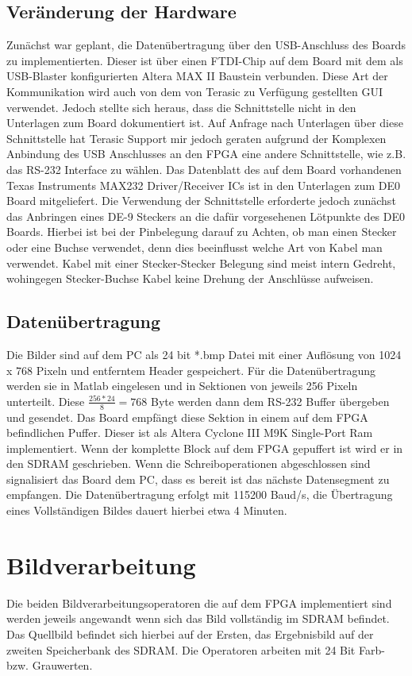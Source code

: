 \documentclass[%
  paper=A4, %
  pagesize, %
  12pt,
  ngerman   %
]{scrreprt}  %
\begin{document}
\section{Veränderung der Hardware}
Zunächst war geplant, die Datenübertragung über den USB-Anschluss des Boards zu implementierten. Dieser ist über einen FTDI-Chip auf dem Board mit dem als USB-Blaster konfigurierten Altera MAX II Baustein verbunden. Diese Art der Kommunikation wird auch von dem von Terasic zu Verfügung gestellten GUI verwendet. Jedoch stellte sich heraus, dass die Schnittstelle nicht in den Unterlagen zum Board dokumentiert ist. Auf Anfrage nach Unterlagen über diese Schnittstelle hat Terasic Support mir jedoch geraten aufgrund der Komplexen Anbindung des USB Anschlusses an den FPGA eine andere Schnittstelle, wie z.B. das RS-232 Interface zu wählen. Das Datenblatt des auf dem Board vorhandenen Texas Instruments MAX232 Driver/Receiver ICs ist in den Unterlagen zum DE0 Board mitgeliefert. Die Verwendung der Schnittstelle erforderte jedoch zunächst das Anbringen eines DE-9 Steckers an die dafür vorgesehenen Lötpunkte des DE0 Boards. Hierbei ist bei der Pinbelegung darauf zu Achten, ob man einen Stecker oder eine Buchse verwendet, denn dies beeinflusst welche Art von Kabel man verwendet. Kabel mit einer Stecker-Stecker Belegung sind meist intern Gedreht, wohingegen Stecker-Buchse Kabel keine Drehung der Anschlüsse aufweisen.

\section{Datenübertragung}
Die Bilder sind auf dem PC als 24 bit *.bmp Datei mit einer Auflösung von 1024 x 768 Pixeln und entferntem Header gespeichert. Für die Datenübertragung werden sie in Matlab eingelesen und in Sektionen von jeweils 256 Pixeln unterteilt. Diese $\frac{256*24}{8}=768$ Byte werden dann dem RS-232 Buffer übergeben und gesendet. Das Board empfängt diese Sektion in einem auf dem FPGA befindlichen Puffer. Dieser ist als Altera Cyclone III M9K Single-Port Ram implementiert. Wenn der komplette Block auf dem FPGA gepuffert ist wird er in den SDRAM geschrieben. Wenn die Schreiboperationen abgeschlossen sind signalisiert das Board dem PC, dass es bereit ist das nächste Datensegment zu empfangen. Die Datenübertragung erfolgt mit 115200 Baud/s, die Übertragung eines Vollständigen Bildes dauert hierbei etwa 4 Minuten.

\chapter{Bildverarbeitung}
Die beiden Bildverarbeitungsoperatoren die auf dem FPGA implementiert sind werden jeweils angewandt wenn sich das Bild vollständig im SDRAM befindet. Das Quellbild befindet sich hierbei auf der Ersten, das Ergebnisbild auf der zweiten Speicherbank des SDRAM. Die Operatoren arbeiten mit 24 Bit Farb- bzw. Grauwerten.
\end{document}
